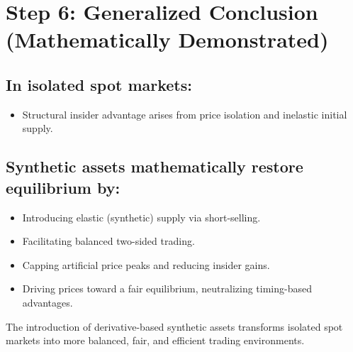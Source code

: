 \documentclass{article}
\begin{document}
\section{Step 6: Generalized Conclusion (Mathematically Demonstrated)}

\subsection*{In isolated spot markets:}
\begin{itemize}
    \item Structural insider advantage arises from price isolation and inelastic initial supply.
\end{itemize}

\subsection*{Synthetic assets mathematically restore equilibrium by:}
\begin{itemize}
    \item Introducing elastic (synthetic) supply via short-selling.
    \item Facilitating balanced two-sided trading.
    \item Capping artificial price peaks and reducing insider gains.
    \item Driving prices toward a fair equilibrium, neutralizing timing-based advantages.
\end{itemize}

The introduction of derivative-based synthetic assets transforms isolated spot markets into more balanced, fair, and efficient trading environments.
\end{document}
